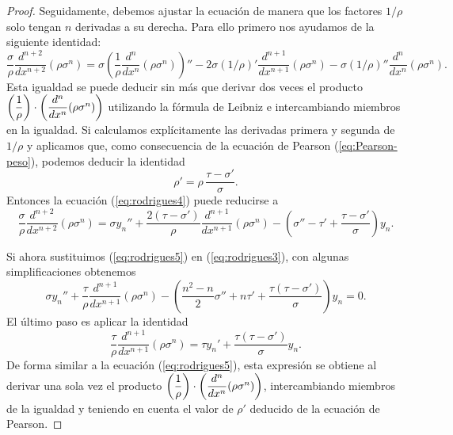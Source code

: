 \begin{proof}
    Seguidamente, debemos ajustar la ecuación de manera que los factores $1/\rho$ solo tengan $n$ derivadas a su derecha. Para ello primero nos ayudamos de la siguiente identidad:
    \begin{equation}
        \label{eq:rodrigues4}
        \frac{\sigma}{\rho} \frac{d^{n+2}}{d x^{n+2}} \left(\rho\sigma^n\right) = \sigma \left(\dfrac 1 {\rho} \dfrac{d^n}{dx^n} (\rho\sigma^n)\right)'' - 2\sigma (1/\rho)' \frac{d^{n+1}}{d x^{n+1}} \left(\rho\sigma^n \right) -\sigma (1/\rho)'' \dfrac{d^n}{dx^n} (\rho\sigma^n).
    \end{equation}
    Esta igualdad se puede deducir sin más que derivar dos veces el producto $\left(\dfrac 1 {\rho}\right)\cdot\nolinebreak\left(\dfrac{d^n}{dx^n} (\rho\sigma^n)\right)$ utilizando la fórmula de Leibniz e intercambiando miembros en la igualdad. Si calculamos explícitamente las derivadas primera y segunda de $1/\rho$ y aplicamos que, como consecuencia de la ecuación de Pearson (\ref{eq:Pearson-peso}), podemos deducir la identidad
    \begin{equation}
        \label{eq:derivada-rho}
        \rho' = \rho\,\frac{\tau-\sigma'}{\sigma}.
    \end{equation}
    Entonces la ecuación (\ref{eq:rodrigues4}) puede reducirse a 
    \begin{equation}
        \label{eq:rodrigues5}
        \frac{\sigma}{\rho} \frac{d^{n+2}}{d x^{n+2}} \left(\rho\sigma^n\right) = \sigma y_n'' + \frac{2(\tau-\sigma')}\rho\frac{d^{n+1}}{d x^{n+1}} \left(\rho\sigma^n \right) - \left(\sigma'' - \tau' + \dfrac{\tau-\sigma'}\sigma\right)y_n.
    \end{equation}

    Si ahora sustituimos (\ref{eq:rodrigues5}) en (\ref{eq:rodrigues3}), con algunas simplificaciones obtenemos
    \begin{equation}
        \label{eq:rodrigues5.5}
        \sigma y_n'' + \frac{\tau}{\rho} \frac{d^{n+1}}{d x^{n+1}} \left(\rho\sigma^n \right) - \left(\frac{n^2-n}{2}\sigma''+n\tau'+\frac{\tau(\tau-\sigma')}{\sigma}  \right)y_n = 0.
    \end{equation}
    El último paso es aplicar la identidad 
    \begin{equation}
        \label{eq:rodrigues6}
        \frac{\tau}{\rho}\frac{d^{n+1}}{d x^{n+1}} \left(\rho\sigma^n \right) = \tau y_n'+\frac{\tau(\tau-\sigma')}{\sigma}y_n.
    \end{equation}
    De forma similar a la ecuación (\ref{eq:rodrigues5}), esta expresión se obtiene al derivar una sola vez el producto $\left(\dfrac 1 {\rho}\right)\cdot\nolinebreak\left(\dfrac{d^n}{dx^n} (\rho\sigma^n)\right)$, intercambiando miembros de la igualdad y teniendo en cuenta el valor de $\rho'$ deducido de la ecuación de Pearson. 


\end{proof}
